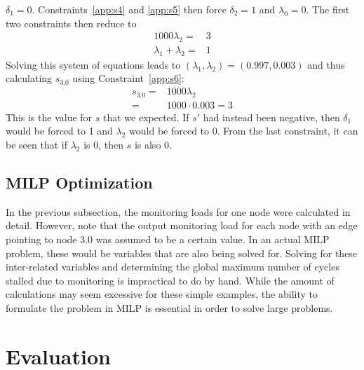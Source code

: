 $\delta_1 = 0$. Constraints~\ref{app:s4} and \ref{app:s5} then force $\delta_2 = 1$ and $\lambda_0 =
0$. The first two constraints then reduce to
\begin{align*}
  1000\lambda_2 =& 3\\
  \lambda_1 + \lambda_2 =& 1 
\end{align*}
Solving this system of equations leads to $(\lambda_1, \lambda_2) = (0.997, 0.003)$ and thus calculating $s_{3.0}$ using Constraint~\ref{app:s6}:
\begin{align*}
  s_{3.0} =& 1000 \lambda_2 \\
  =& 1000 \cdot 0.003 = 3
\end{align*}
This is the value for $s$ that we expected. If $s'$ had instead been negative,
then $\delta_1$ would be forced to 1 and $\lambda_2$ would be forced to 0. From
the last constraint, it can be seen that if $\lambda_2$ is 0, then $s$ is also
0.

\subsection{MILP Optimization}

In the previous subsection, the monitoring loads for one node were calculated
in detail. However, note that the output monitoring load for each node with an
edge pointing to node 3.0 was assumed to be a certain value. In an actual MILP
problem, these would be variables that are also being solved for. Solving for
these inter-related variables and determining the global maximum number of
cycles stalled due to monitoring is impractical to do by hand. 
While the amount of calculations
may seem excessive for these simple examples, the ability to formulate the
problem in MILP is essential in order to solve large problems.



\vspace{-0.1in}
\section{Evaluation}
\label{sec:evaluation}

